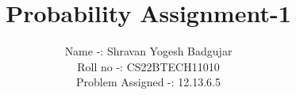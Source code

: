 \documentclass[journal,12pt,twocolumn]{IEEEtran}
\begin{document}
	\let\vec\mathbf
		
		
		
		
		\vspace{3cm}
		
		\title{
				Probability Assignment-1
		}
		\author{ Name -: Shravan Yogesh Badgujar
			
			Roll no -: CS22BTECH11010
			
			Problem Assigned -: 12.13.6.5%
			
			
		}	
		
		
		
\end{document}

